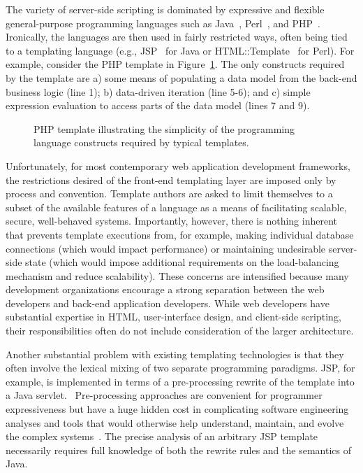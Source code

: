 \documentclass{www2003-submission}
\newcommand{\figref}[1]{Figure~\ref{fig-#1}}
\begin{document}
The variety of server-side scripting is dominated by expressive and
flexible general-purpose programming languages such as
Java~\cite{Java}, Perl~\cite{Perl}, and PHP~\cite{PHP}.  Ironically,
the languages are then used in fairly restricted ways, often being
tied to a templating language (e.g., JSP~\cite{JSP} for Java or
HTML::Template~\cite{HTML-Template} for Perl).  For example, consider
the PHP template in \figref{php-books}.  The only constructs required
by the template are a) some means of populating a data model from the
back-end business logic (line 1); b) data-driven iteration (line
5-6); and c) simple expression evaluation to access parts of the data
model (lines 7 and 9). %

\begin{figure}[htbp]
\caption{PHP template illustrating the simplicity of the programming
language constructs required by typical templates.
\label{fig-php-books}}
\end{figure}

Unfortunately, for most contemporary web application development
frameworks, the restrictions desired of the front-end templating layer
are imposed only by process and convention.  Template authors are
asked to limit themselves to a subset of the available features of a
language as a means of facilitating scalable, secure, well-behaved
systems.  Importantly, however, there is nothing inherent that
prevents template executions from, for example, making individual
database connections (which would impact performance) or maintaining
undesirable server-side state (which would impose additional
requirements on the load-balancing mechanism and reduce scalability).
These concerns are intensified because many development organizations
encourage a strong separation between the web developers and back-end
application developers. While web developers have substantial
expertise in HTML, user-interface design, and client-side scripting,
their responsibilities often do not include consideration of the
larger architecture.

Another substantial problem with existing templating technologies is
that they often involve the lexical mixing of two separate programming
paradigms.  JSP, for example, is implemented in terms of a
pre-processing rewrite of the template into a Java servlet.~\cite{JaveServlet}
Pre-processing approaches are convenient for programmer expressiveness
but have a huge hidden cost in complicating software engineering
analyses and tools that would otherwise help understand, maintain, and
evolve the complex systems~\cite{PCP3,EvilMacros,StroustropDnEChapterAboutCpp}.
The precise analysis of an arbitrary JSP template necessarily requires
full knowledge of both the rewrite rules and the semantics of Java.
\end{document}
